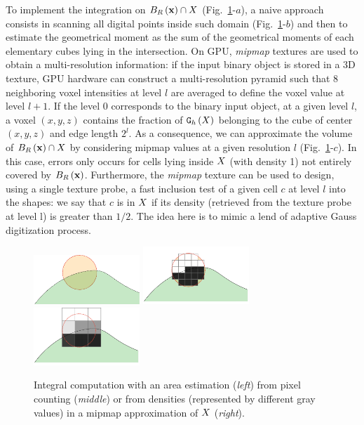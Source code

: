 \documentclass{llncs}
\begin{document}
To implement the integration on $B_{R}\left(\mathbf{x}\right) \cap X$
(Fig.~\ref{fig:approx}-$a$), a naive approach consists in scanning all digital
points inside such domain (Fig.~\ref{fig:approx}-$b$) and then to estimate the
geometrical moment as the sum of the geometrical moments of each elementary
cubes lying in the intersection. On GPU, \emph{mipmap} textures are used to
obtain a multi-resolution information: if the input binary object is stored in a
3D texture, GPU hardware can construct a multi-resolution pyramid such that 8
neighboring voxel intensities at level $l$ are averaged to define the voxel
value at level $l+1$. If the level 0 corresponds to the binary input object, at
a given level $l$, a voxel $(x,y,z)$ contains the fraction of $\mathtt{G}_{h}\left(X\right)$ belonging
to the cube of center $(x,y,z)$ and edge length $2^l$. As a consequence, we can
approximate the volume of $B_{R}\left(\mathbf{x}\right)\cap X$ by considering mipmap values
at a given resolution $l$ (Fig.~\ref{fig:approx}-$c$). In this case, errors only
occurs for cells lying inside $X$ (with density 1) not entirely covered by
$B_{R}\left(\mathbf{x}\right)$. Furthermore, the \emph{mipmap} texture can be used to design,
using a single texture probe, a fast inclusion test of a given cell $c$ at level
$l$ into the shapes: we say that $c$ is in $X$ if its density (retrieved
from the texture probe at level l) is greater than $1/2$. The idea here is to
mimic a lend of adaptive Gauss digitization process.

\begin{figure}
  \begin{center}
    {\includegraphics[width=4cm]{figs/approx1}}
    {\includegraphics[width=4cm]{figs/approx-reg-1}}
    {\includegraphics[width=4cm]{figs/approx-reg-2}}
  \end{center}
  \caption{Integral computation with an area estimation (\emph{left}) from pixel
    counting (\emph{middle}) or from densities (represented by different
    gray values) in a mipmap approximation of $X$ (\emph{right}).}
  \label{fig:approx}
\end{figure}
\end{document}
